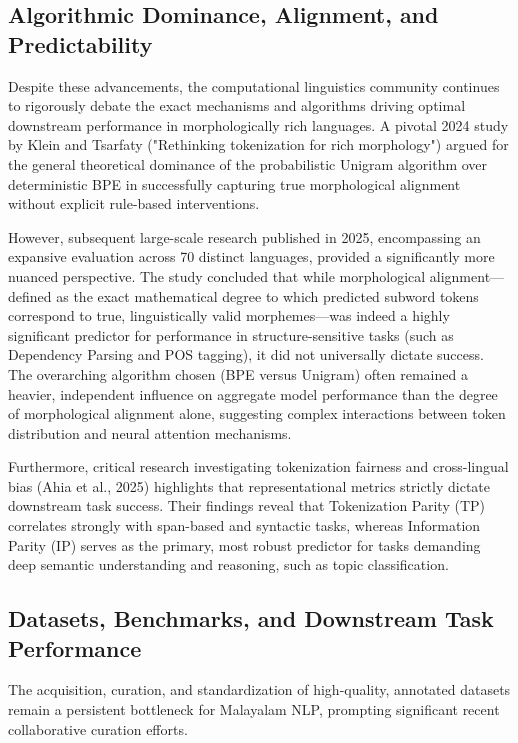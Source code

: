 \documentclass[12pt]{article}
\begin{document}
	\subsection{Algorithmic Dominance, Alignment, and Predictability}
	
	Despite these advancements, the computational linguistics community continues to rigorously debate the exact mechanisms and algorithms driving optimal downstream performance in morphologically rich languages. A pivotal 2024 study by Klein and Tsarfaty ("Rethinking tokenization for rich morphology") argued for the general theoretical dominance of the probabilistic Unigram algorithm over deterministic BPE in successfully capturing true morphological alignment without explicit rule-based interventions. 
	
	However, subsequent large-scale research published in 2025, encompassing an expansive evaluation across 70 distinct languages, provided a significantly more nuanced perspective. The study concluded that while morphological alignment—defined as the exact mathematical degree to which predicted subword tokens correspond to true, linguistically valid morphemes—was indeed a highly significant predictor for performance in structure-sensitive tasks (such as Dependency Parsing and POS tagging), it did not universally dictate success. The overarching algorithm chosen (BPE versus Unigram) often remained a heavier, independent influence on aggregate model performance than the degree of morphological alignment alone, suggesting complex interactions between token distribution and neural attention mechanisms. 
	
	Furthermore, critical research investigating tokenization fairness and cross-lingual bias (Ahia et al., 2025) highlights that representational metrics strictly dictate downstream task success. Their findings reveal that Tokenization Parity (TP) correlates strongly with span-based and syntactic tasks, whereas Information Parity (IP) serves as the primary, most robust predictor for tasks demanding deep semantic understanding and reasoning, such as topic classification. 
	
	\subsection{Datasets, Benchmarks, and Downstream Task Performance}
	
	The acquisition, curation, and standardization of high-quality, annotated datasets remain a persistent bottleneck for Malayalam NLP, prompting significant recent collaborative curation efforts. 
	
\end{document}

